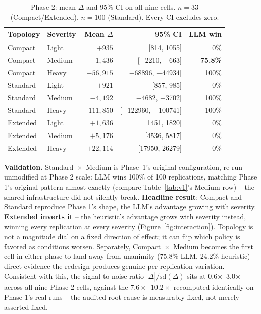 \documentclass[10pt,twocolumn]{article}
\begin{document}
\begin{table}[t]
\centering
\small
\begin{tabular}{@{}llrrr@{}}
\toprule
Topology & Severity & Mean $\Delta$ & 95\% CI & LLM win \\
\midrule
Compact  & Light  & $+935$ & [814, 1055]      & 0\% \\
Compact  & Medium & $-1{,}436$ & [$-$2210, $-$663] & \textbf{75.8\%} \\
Compact  & Heavy  & $-56{,}915$ & [$-$68896, $-$44934] & 100\% \\
Standard & Light  & $+921$ & [857, 985]        & 0\% \\
Standard & Medium & $-4{,}192$ & [$-$4682, $-$3702] & 100\% \\
Standard & Heavy  & $-111{,}850$ & [$-$122960, $-$100741] & 100\% \\
Extended & Light  & $+1{,}636$ & [1451, 1820]    & 0\% \\
Extended & Medium & $+5{,}176$ & [4536, 5817]    & 0\% \\
Extended & Heavy  & $+22{,}114$ & [17950, 26279]  & 0\% \\
\bottomrule
\end{tabular}
\caption{Phase 2: mean $\Delta$ and 95\% CI on all nine cells. $n=33$ (Compact/Extended), $n=100$ (Standard). Every CI excludes zero.}
\label{tab:v2}
\end{table}

\textbf{Validation.} Standard~$\times$~Medium is Phase~1's original configuration, re-run unmodified at Phase 2 scale: LLM wins 100\% of 100 replications, matching Phase 1's original pattern almost exactly (compare Table~\ref{tab:v1}'s Medium row) -- the shared infrastructure did not silently break. \textbf{Headline result}: Compact and Standard reproduce Phase 1's shape, the LLM's advantage growing with severity. \textbf{Extended inverts it} -- the heuristic's advantage grows with severity instead, winning every replication at every severity (Figure~\ref{fig:interaction}). Topology is not a magnitude dial on a fixed direction of effect; it can flip which policy is favored as conditions worsen. Separately, Compact~$\times$~Medium becomes the first cell in either phase to land away from unanimity (75.8\% LLM, 24.2\% heuristic) -- direct evidence the redesign produces genuine per-replication variation. Consistent with this, the signal-to-noise ratio $|\overline{\Delta}|/\mathrm{sd}(\Delta)$ sits at 0.6$\times$--3.0$\times$ across all nine Phase 2 cells, against the $7.6\times$--$10.2\times$ recomputed identically on Phase 1's real runs -- the audited root cause is measurably fixed, not merely asserted fixed.
\end{document}
